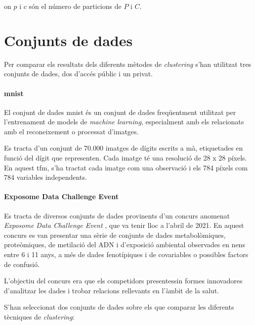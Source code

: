 \documentclass[CAT,BIB]{TFUOC}%
\begin{document}
                on $p$ i $c$ són el número de particions de $P$ i $C$.


    \section{Conjunts de dades}
    \label{s:dades}

    Per comparar els resultats dels diferents mètodes de \textit{clustering}
    s'han utilitzat tres conjunts de dades,
    dos d'accés públic i un privat.

    \paragraph{\acrshort{mnist}}
        El conjunt de dades \gls{mnist} \citep{Deng2012}
        és un conjunt de dades freqüentment utilitzat
        per l'entrenament de models de \textit{machine learning},
        especialment amb els relacionats amb el reconeixement o processat d'imatges.

        Es tracta d'un conjunt de 70.000 imatges
        de dígits escrits a mà,
        etiquetades en funció del dígit que representen.
        Cada imatge té una resolució de 28 x 28 píxels.
        En aquest \gls{tfm}, s'ha tractat cada imatge com una observació
        i els 784 píxels com 784 variables independents.

    \paragraph{Exposome Data Challenge Event}
        Es tracta de diversos conjunts de dades
        provinents d'un concurs anomenat \textit{Exposome Data Challenge Event} \citep{Maitre2022},
        que va tenir lloc a l'abril de 2021.
        En aquest concurs es van presentar una sèrie de conjunts de dades
        metabolòmiques, proteòmiques, de metilació del ADN i d'exposició ambiental
        observades en nens entre 6 i 11 anys,
        a més de dades fenotípiques
        i de covariables o possibles factors de confusió.

        L'objectiu del concurs era que els competidors
        presentessin formes innovadores d'analitzar les dades
        i trobar relacions rellevants en l'àmbit de la salut.

        S'han seleccionat dos conjunts de dades
        sobre els que comparar les diferents tècniques de \textit{clustering}:
\end{document}
